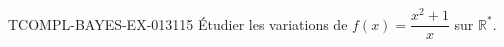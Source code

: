 \begin{exercice}{TCOMPL-BAYES-EX-013}{1}{15}
Étudier les variations de $f(x) = \dfrac{x^2+1}{x}$ sur $\mathbb{R}^*$.

\end{exercice}
